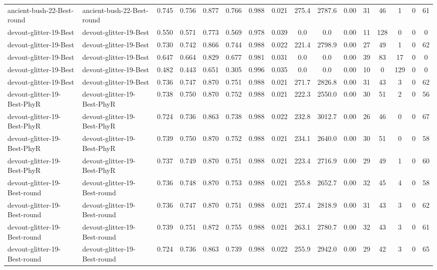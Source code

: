 \begin{table*}[p]
{\begin{tabular}{llcccccccccccccc}
      ancient-bush-22-Best-round & ancient-bush-22-Best-round & 0.745 & 0.756 & 0.877 & 0.766 & 0.988 & 0.021 & 275.4 & 2787.6 & 0.00 & 31 & 46 & 1 & 0 & 61 \\
      devout-glitter-19-Best & devout-glitter-19-Best & 0.550 & 0.571 & 0.773 & 0.569 & 0.978 & 0.039 & 0.0 & 0.0 & 0.00 & 11 & 128 & 0 & 0 & 0 \\
      devout-glitter-19-Best & devout-glitter-19-Best & 0.730 & 0.742 & 0.866 & 0.744 & 0.988 & 0.022 & 221.4 & 2798.9 & 0.00 & 27 & 49 & 1 & 0 & 62 \\
      devout-glitter-19-Best & devout-glitter-19-Best & 0.647 & 0.664 & 0.829 & 0.677 & 0.981 & 0.031 & 0.0 & 0.0 & 0.00 & 39 & 83 & 17 & 0 & 0 \\
      devout-glitter-19-Best & devout-glitter-19-Best & 0.482 & 0.443 & 0.651 & 0.305 & 0.996 & 0.035 & 0.0 & 0.0 & 0.00 & 10 & 0 & 129 & 0 & 0 \\
      devout-glitter-19-Best & devout-glitter-19-Best & 0.736 & 0.747 & 0.870 & 0.751 & 0.988 & 0.021 & 271.7 & 2826.8 & 0.00 & 31 & 43 & 3 & 0 & 62 \\
      devout-glitter-19-Best-PhyR & devout-glitter-19-Best-PhyR & 0.738 & 0.750 & 0.870 & 0.752 & 0.988 & 0.021 & 222.3 & 2550.0 & 0.00 & 30 & 51 & 2 & 0 & 56 \\
      devout-glitter-19-Best-PhyR & devout-glitter-19-Best-PhyR & 0.724 & 0.736 & 0.863 & 0.738 & 0.988 & 0.022 & 232.8 & 3012.7 & 0.00 & 26 & 46 & 0 & 0 & 67 \\
      devout-glitter-19-Best-PhyR & devout-glitter-19-Best-PhyR & 0.739 & 0.750 & 0.870 & 0.752 & 0.988 & 0.021 & 234.1 & 2640.0 & 0.00 & 30 & 51 & 0 & 0 & 58 \\
      devout-glitter-19-Best-PhyR & devout-glitter-19-Best-PhyR & 0.737 & 0.749 & 0.870 & 0.751 & 0.988 & 0.021 & 223.4 & 2716.9 & 0.00 & 29 & 49 & 1 & 0 & 60 \\
      devout-glitter-19-Best-round & devout-glitter-19-Best-round & 0.736 & 0.748 & 0.870 & 0.753 & 0.988 & 0.021 & 255.8 & 2652.7 & 0.00 & 32 & 45 & 4 & 0 & 58 \\
      devout-glitter-19-Best-round & devout-glitter-19-Best-round & 0.736 & 0.747 & 0.870 & 0.751 & 0.988 & 0.021 & 257.4 & 2818.9 & 0.00 & 31 & 43 & 3 & 0 & 62 \\
      devout-glitter-19-Best-round & devout-glitter-19-Best-round & 0.739 & 0.751 & 0.872 & 0.755 & 0.988 & 0.021 & 263.1 & 2780.7 & 0.00 & 32 & 43 & 3 & 0 & 61 \\
      devout-glitter-19-Best-round & devout-glitter-19-Best-round & 0.724 & 0.736 & 0.863 & 0.739 & 0.988 & 0.022 & 255.9 & 2942.0 & 0.00 & 29 & 42 & 3 & 0 & 65 \\

\end{tabular}}
\end{table*}
